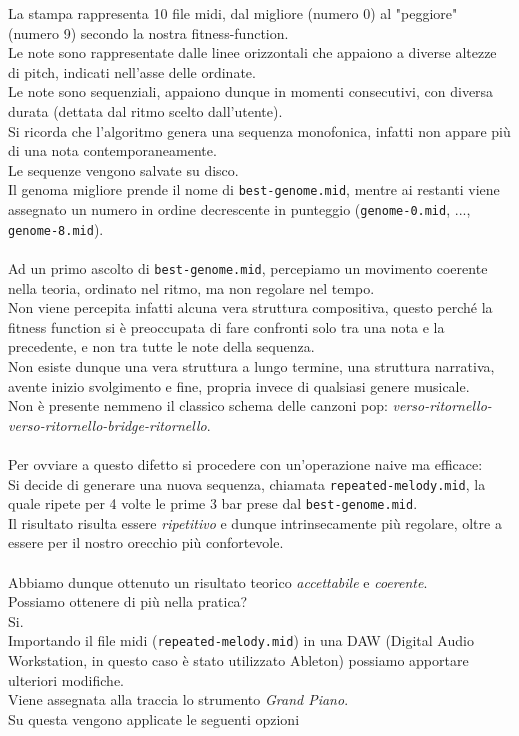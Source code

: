 \documentclass[a4paper,12pt]{report}
\begin{document}
La stampa rappresenta 10 file midi, dal migliore (numero 0) al "peggiore" (numero 9) secondo la nostra fitness-function. \\
Le note sono rappresentate dalle linee orizzontali che appaiono a diverse altezze di pitch, indicati nell'asse delle ordinate. \\
Le note sono sequenziali, appaiono dunque in momenti consecutivi, con diversa durata (dettata dal ritmo scelto dall'utente). \\
Si ricorda che l'algoritmo genera una sequenza monofonica, infatti non appare più di una nota contemporaneamente. \\
Le sequenze vengono salvate su disco. \\
Il genoma migliore prende il nome di \texttt{best-genome.mid}, mentre ai restanti viene assegnato un numero in ordine decrescente in punteggio (\texttt{genome-0.mid}, ..., \texttt{genome-8.mid}). \\
\\
Ad un primo ascolto di \texttt{best-genome.mid}, percepiamo un movimento coerente nella teoria, ordinato nel ritmo, ma non regolare nel tempo. \\
Non viene percepita infatti alcuna vera struttura compositiva, questo perché la fitness function si è preoccupata di fare confronti solo tra una nota e la precedente, e non tra tutte le note della sequenza. \\
Non esiste dunque una vera struttura a lungo termine, una struttura narrativa, avente inizio svolgimento e fine, propria invece di qualsiasi genere musicale. \\
Non è presente nemmeno il classico schema delle canzoni pop: \textit{verso-ritornello-verso-ritornello-bridge-ritornello}. \\
\\
Per ovviare a questo difetto si procedere con un'operazione naive ma efficace: \\
Si decide di generare una nuova sequenza, chiamata \texttt{repeated-melody.mid}, la quale ripete per 4 volte le prime 3 bar prese dal \texttt{best-genome.mid}. \\
Il risultato risulta essere \textit{ripetitivo} e dunque intrinsecamente più regolare, oltre a essere per il nostro orecchio più confortevole. \\
\\
Abbiamo dunque ottenuto un risultato teorico \textit{accettabile} e \textit{coerente}. \\
Possiamo ottenere di più nella pratica? \\
Si. \\
Importando il file midi (\texttt{repeated-melody.mid}) in una DAW (Digital Audio Workstation, in questo caso è stato utilizzato Ableton) possiamo apportare ulteriori modifiche. \\
Viene assegnata alla traccia lo strumento \textit{Grand Piano}. \\
Su questa vengono applicate le seguenti opzioni
\end{document}
